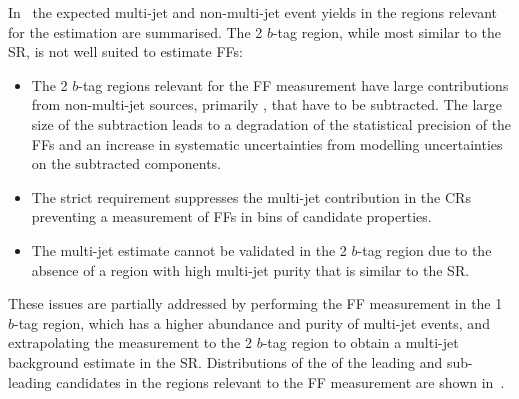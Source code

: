 In~ the expected multi-jet and non-multi-jet event
yields in the regions relevant for the \faketauhadvis estimation are
summarised. The 2 $b$-tag region, while most similar to the SR, is not well
suited to estimate FFs:
\begin{itemize}

\item The 2 $b$-tag regions relevant for the FF measurement have large
  contributions from non-multi-jet sources, primarily \ttbarFakes, that have to
  be subtracted. The large size of the subtraction leads to a degradation of the
  statistical precision of the FFs and an increase in systematic uncertainties
  from modelling uncertainties on the subtracted components.

\item The strict \btag requirement suppresses the multi-jet contribution in the
  CRs preventing a measurement of FFs in bins of \tauhadvis candidate
  properties.

\item The multi-jet estimate cannot be validated in the 2 $b$-tag region due to
  the absence of a region with high multi-jet purity that is similar to the SR.

\end{itemize}
These issues are partially addressed by performing the FF measurement in the 1
$b$-tag region, which has a higher abundance and purity of multi-jet events, and
extrapolating the measurement to the 2 $b$-tag region to obtain a multi-jet
background estimate in the SR. Distributions of the \pT of the leading and
sub-leading \tauhadvis candidates in the regions relevant to the FF measurement
are shown in~.

